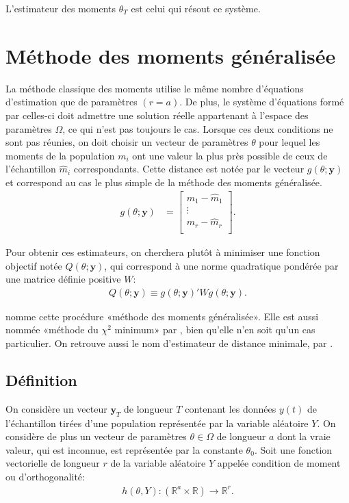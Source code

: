 L'estimateur des moments $\hat\theta_T$ est celui qui résout ce
système.

\section{Méthode des moments généralisée}
\label{sec:methodeGMM}

La méthode classique des moments utilise le même nombre d'équations
d'estimation que de paramètres $(r=a)$.  De plus, le système
d'équations formé par celles-ci doit admettre une solution réelle
appartenant à l'espace des paramètres $\Omega$, ce qui n'est pas
toujours le cas. Lorsque ces deux conditions ne sont pas réunies, on
doit choisir un vecteur de paramètres $\theta$ pour lequel les moments
de la population $m_i$ ont une valeur la plus près possible de ceux
de l'échantillon $\hat{m}_i$ correspondants. Cette distance est notée
par le vecteur $g(\theta;\mathbf{y})$ et correspond au cas le plus
simple de la méthode des moments généralisée.
\begin{align}
  \label{eq:1}
  g(\theta;\mathbf{y}) &= \begin{bmatrix}
    m_1 - \hat{m}_1\\
    \vdots\\
    m_r - \hat{m}_r\\
  \end{bmatrix}.
\end{align}

Pour obtenir ces estimateurs, on cherchera plutôt à minimiser une
fonction objectif notée $Q\left(\theta;\mathbf{y} \right)$, qui
correspond à une norme quadratique pondérée par une matrice définie
positive $W$:
\begin{align}
  Q\left(\theta;\mathbf{y} \right) \equiv g(\theta;\mathbf{y})' W
  g(\theta;\mathbf{y}).
\end{align}

\cite{hansen1982large} nomme cette procédure «méthode des moments
généralisée». Elle est aussi nommée «méthode du $\chi^2$ minimum» par
\cite{berkson1980minimum}, bien qu'elle n'en soit qu'un cas
particulier. On retrouve aussi le nom d'estimateur de distance
minimale, par \cite{wolfowitz1957minimum}.

\subsection{Définition}
\label{sec:definitionGMM}

On considère un vecteur $\mathbf{y}_{T}$ de longueur $T$ contenant les
données $y(t)$ de l'échantillon tirées d'une population représentée
par la variable aléatoire $Y$. On considère de plus un vecteur de
paramètres $\theta \in \Omega$ de longueur $a$ dont la vraie valeur,
qui est inconnue, est représentée par la constante $\theta_0$. Soit
une fonction vectorielle de longueur $r$ de la variable aléatoire $Y$
appelée condition de moment ou d'orthogonalité:
\begin{align}
  \label{eq:def1condmoment}
  h\left(\theta,Y\right):\left(\mathbb{R}^a \times \mathbb{R}\right)
  \longrightarrow \mathbb{R}^r.
\end{align}

